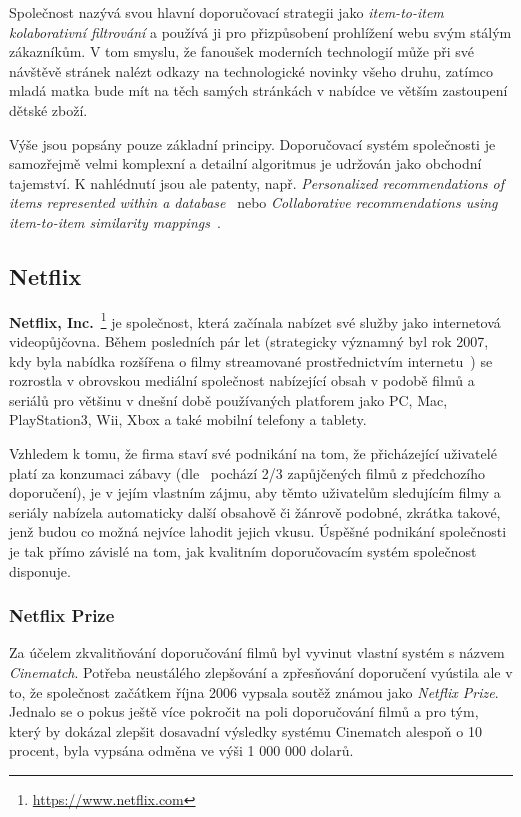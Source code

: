 \documentclass[thesis=M,czech]{FITthesis}[2014/05/07]
\begin{document}
Společnost nazývá svou hlavní doporučovací strategii jako \emph{item-to-item kolaborativní filtrování} a používá ji pro přizpůsobení prohlížení webu svým stálým zákazníkům. V tom smyslu, že fanoušek moderních technologií může při své návštěvě stránek nalézt odkazy na technologické novinky všeho druhu, zatímco mladá matka bude mít na těch samých stránkách v nabídce ve větším zastoupení dětské zboží.
 
Výše jsou popsány pouze základní principy. Doporučovací systém společnosti je samozřejmě velmi komplexní a detailní algoritmus je udržován jako obchodní tajemství. K nahlédnutí jsou ale patenty, např. \emph{Personalized recommendations of items represented within a database}~\cite{jacobi2006personalized} nebo \emph{Collaborative recommendations using item-to-item similarity mappings}~\cite{linden2001collaborative}.

\subsection{Netflix}

\textbf{Netflix, Inc.}~\footnote{\url{https://www.netflix.com}} je společnost, která začínala nabízet své služby jako internetová videopůjčovna. Během posledních pár let (strategicky významný byl rok 2007, kdy byla nabídka rozšířena o filmy streamované prostřednictvím internetu~\cite{netflix2007}) se rozrostla v obrovskou mediální společnost nabízející obsah v podobě filmů a seriálů pro většinu v dnešní době používaných platforem jako PC, Mac, PlayStation3, Wii, Xbox a také mobilní telefony a tablety. 

Vzhledem k tomu, že firma staví své podnikání na tom, že přicházející uživatelé platí za konzumaci zábavy (dle~\cite{netflixrec} pochází 2/3 zapůjčených filmů z předchozího doporučení), je v jejím vlastním zájmu, aby těmto uživatelům sledujícím filmy a seriály nabízela automaticky další obsahově či žánrově podobné, zkrátka takové, jenž budou co možná nejvíce lahodit jejich vkusu. Úspěšné podnikání společnosti je tak přímo závislé na tom, jak kvalitním doporučovacím systém společnost disponuje. 

\subsubsection{Netflix Prize}

Za účelem zkvalitňování doporučování filmů byl vyvinut vlastní systém s názvem \emph{Cinematch}. Potřeba neustálého zlepšování a zpřesňování doporučení vyústila ale v to, že společnost začátkem října 2006 vypsala soutěž známou jako \emph{Netflix Prize}. Jednalo se o pokus ještě více pokročit na poli doporučování filmů a pro tým, který by dokázal zlepšit dosavadní výsledky systému Cinematch alespoň o 10 procent, byla vypsána odměna ve výši 1 000 000 dolarů.
\end{document}
